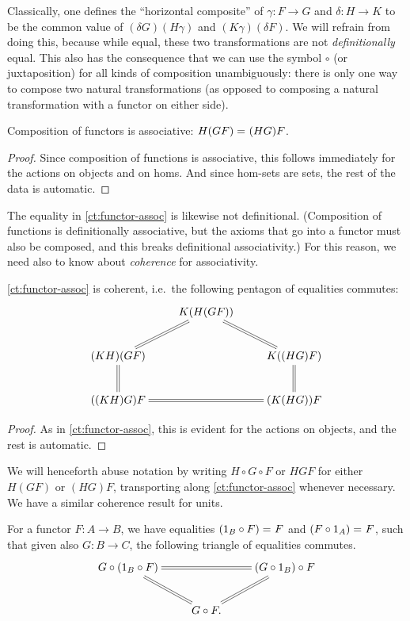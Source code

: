 Classically, one defines the ``horizontal composite'' of $\gamma:F\to G$ and $\delta:H\to K$ to be the common value of ${(\delta G)(H\gamma)}$ and ${(K\gamma)(\delta F)}$.
We will refrain from doing this, because while equal, these two transformations are not \emph{definitionally} equal.
This also has the consequence that we can use the symbol $\circ$ (or juxtaposition) for all kinds of composition unambiguously: there is only one way to compose two natural transformations (as opposed to composing a natural transformation with a functor on either side).

\begin{lem}\label{ct:functor-assoc}
  Composition of functors is associative: $H(GF) =_{} (HG)F$.
\end{lem}
\begin{proof}
  Since composition of functions is associative, this follows immediately for the actions on objects and on homs.
  And since hom-sets are sets, the rest of the data is automatic.
\end{proof}

The equality in \autoref{ct:functor-assoc} is likewise not definitional.
(Composition of functions is definitionally associative, but the axioms that go into a functor must also be composed, and this breaks definitional associativity.)  For this reason, we need also to know about \emph{coherence} for associativity.

\begin{lem}\label{ct:pentagon}
  \autoref{ct:functor-assoc} is coherent, i.e.\ the following pentagon of equalities commutes:
  \[ \xymatrix{ & K(H(GF)) \ar@{=}[dl] \ar@{=}[dr]\\
    (KH)(GF) \ar@{=}[d] && K((HG)F) \ar@{=}[d]\\
    ((KH)G)F && (K(HG))F \ar@{=}[ll] }
  \]
\end{lem}
\begin{proof}
  As in \autoref{ct:functor-assoc}, this is evident for the actions on objects, and the rest is automatic.
\end{proof}

We will henceforth abuse notation by writing $H\circ G\circ F$ or $HGF$ for either $H(GF)$ or $(HG)F$, transporting along \autoref{ct:functor-assoc} whenever necessary.
We have a similar coherence result for units.

\begin{lem}\label{ct:units}
  For a functor $F:A\to B$, we have equalities $(1_B\circ F) =_{} F$ and $(F\circ 1_A) =_{} F$, such that given also $G:B\to C$, the following triangle of equalities commutes.
  \[ \xymatrix{
    G\circ (1_B \circ F) \ar@{=}[rr] \ar@{=}[dr] &&
    (G\circ 1_B)\circ F \ar@{=}[dl] \\
    & G \circ F.}
  \]
\end{lem}

